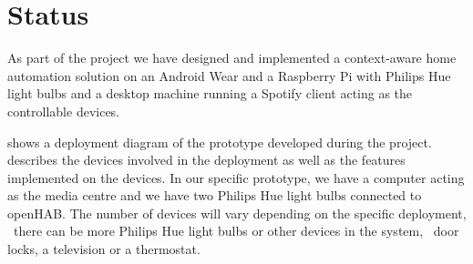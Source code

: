 \section{Status}
\label{sec:implementation:status}

As part of the project we have designed and implemented a context-aware home automation solution on an Android Wear and a Raspberry Pi with Philips Hue light bulbs and a desktop machine running a Spotify client acting as the controllable devices. 

 shows a deployment diagram of the prototype developed during the project.  describes the devices involved in the deployment as well as the features implemented on the devices. In our specific prototype, we have a computer acting as the media centre and we have two Philips Hue light bulbs connected to openHAB. The number of devices will vary depending on the specific deployment, \eg~there can be more Philips Hue light bulbs or other devices in the system, \eg~door locks, a television or a thermostat.

